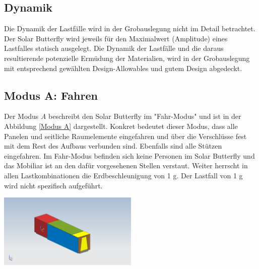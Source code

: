 \subsection{Dynamik}
Die Dynamik der Lastfälle wird in der Grobauslegung nicht im Detail betrachtet. Der Solar Butterfly wird jeweils für den Maximalwert (Amplitude) eines Lastfalles statisch ausgelegt. Die Dynamik der Lastfälle und die daraus resultierende potenzielle Ermüdung der Materialien, wird in der Grobauslegung mit entsprechend gewählten Design-Allowables und gutem Design abgedeckt.

\subsection{Modus A: Fahren}
Der Modus \emph{A} beschreibt den Solar Butterfly im "Fahr-Modus" und ist in der Abbildung \ref{Modus A} dargestellt. Konkret bedeutet dieser Modus, dass alle Panelen und seitliche Raumelemente eingefahren und über die Verschlüsse fest mit dem Rest des Aufbaus verbunden sind. Ebenfalls sind alle Stützen eingefahren. Im Fahr-Modus befinden sich keine Personen im Solar Butterfly und das Mobiliar ist an den dafür vorgesehenen Stellen verstaut. Weiter herrscht in allen Lastkombinationen die Erdbeschleunigung von 1 g. Der Lastfall von 1 g wird nicht spezifisch aufgeführt.

\begin{center}
  \includegraphics[width=0.5\textwidth]{04_Figures/A.png}
  \label{Modus A}
\end{center}

